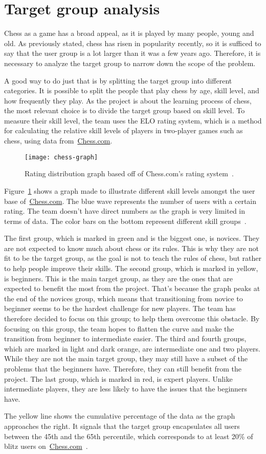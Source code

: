 \section{Target group analysis}\label{sec:target-group-analysis}

Chess as a game has a broad appeal, as it is played by many people, young and old.
As previously stated, chess has risen in popularity recently, so it is sufficed to say that the user group is a lot
larger than it was a few years ago.
Therefore, it is necessary to analyze the target group to narrow down the scope of the problem.

A good way to do just that is by splitting the target group into different categories.
It is possible to split the people that play chess by age, skill level, and how frequently they play.
As the project is about the learning process of chess, the most relevant choice is to divide the target group based on
skill level.
To measure their skill level, the team uses the ELO rating system, which is a method for calculating the relative skill
levels of players in two-player games such as chess, using data from~\url{Chess.com}.

\begin{figure}[H]
    \centering
    \texttt{[image: chess-graph]}
    \caption{Rating distribution graph based off of Chess.com's rating system~\cite{chess-ratings}.}\label{fig:graph}
\end{figure}

Figure~\ref{fig:graph} shows a graph made to illustrate different skill levels amongst the user base
of~\url{Chess.com}.
The blue wave represents the number of users with a certain rating.
The team doesn't have direct numbers as the graph is very limited in terms of data.
The color bars on the bottom represent different skill groups~\cite{chess-ratings}.

The first group, which is marked in green and is the biggest one, is novices.
They are not expected to know much about chess or its rules.
This is why they are not fit to be the target group, as the goal is not to teach the rules of chess, but rather to help
people improve their skills.
The second group, which is marked in yellow, is beginners.
This is the main target group, as they are the ones that are expected to benefit the most from the project.
That's because the graph peaks at the end of the novices group, which means that transitioning from novice to beginner
seems to be the hardest challenge for new players.
The team has therefore decided to focus on this group; to help them overcome this obstacle.
By focusing on this group, the team hopes to flatten the curve and make the transition from beginner to intermediate
easier.
The third and fourth groups, which are marked in light and dark orange, are intermediate one and two players.
While they are not the main target group, they may still have a subset of the problems that the beginners have.
Therefore, they can still benefit from the project.
The last group, which is marked in red, is expert players.
Unlike intermediate players, they are less likely to have the issues that the beginners have.

The yellow line shows the cumulative percentage of the data as the graph approaches the right.
It signals that the target group encapsulates all users between the 45th and the 65th percentile, which corresponds to
at least 20\% of blitz users on~\url{Chess.com}~\cite{chess-ratings}.
